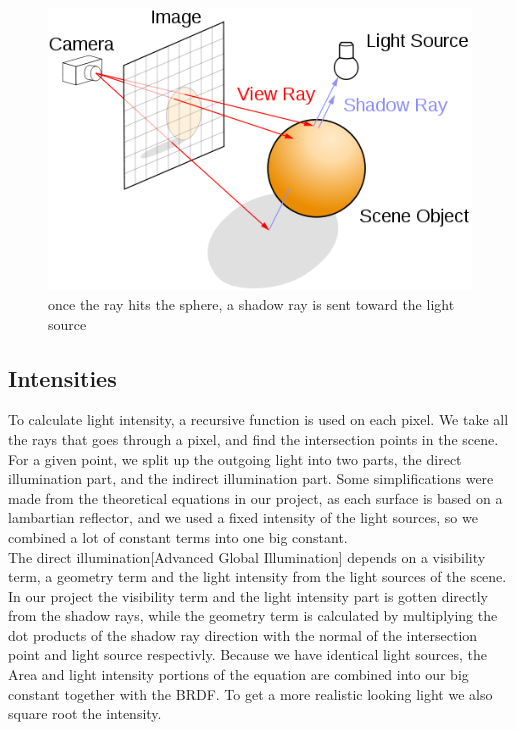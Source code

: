 \documentclass[12pt]{article}
\numberwithin{equation}{section}
\begin{document}
\begin{figure}
  \begin{center}
    \includegraphics[scale=0.5]{500px-Ray_trace_diagram.png}
    \caption{once the ray hits the sphere, a shadow ray is sent toward the light source}
    \label{fig:shadowray}
  \end{center}
\end{figure}

\subsection{Intensities}
To calculate light intensity, a recursive function is used on each pixel. We take all the rays that goes through a pixel, and find the intersection points in the scene. For a given point, we split up the outgoing light into two parts, the direct illumination part, and the indirect illumination part. Some simplifications were made from the theoretical equations in our project, as each surface is based on a lambartian reflector, and we used a fixed intensity of the light sources, so we combined a lot of constant terms into one big constant.\\

The direct illumination[Advanced Global Illumination] depends on a visibility term, a geometry term and the light intensity from the light sources of the scene. In our project the visibility term and the light intensity part is gotten directly from the shadow rays, while the geometry term is calculated by multiplying the dot products of the shadow ray direction with the normal of the intersection point and light source respectivly. Because we have identical light sources, the Area and light intensity portions of the equation are combined into our big constant together with the BRDF. To get a more realistic looking light we also square root the intensity.\\
\end{document}
